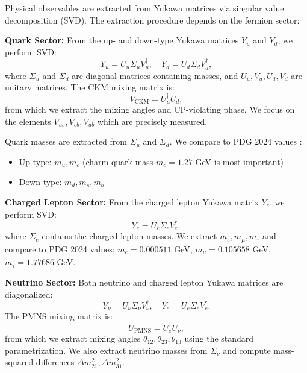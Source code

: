 \documentclass[12pt,a4paper]{article}
\begin{document}
Physical observables are extracted from Yukawa matrices via singular value decomposition (SVD). The extraction procedure depends on the fermion sector:

\textbf{Quark Sector:} From the up- and down-type Yukawa matrices $Y_u$ and $Y_d$, we perform SVD:
\begin{equation}
Y_u = U_u \Sigma_u V_u^\dagger, \quad Y_d = U_d \Sigma_d V_d^\dagger,
\end{equation}
where $\Sigma_u$ and $\Sigma_d$ are diagonal matrices containing masses, and $U_u, V_u, U_d, V_d$ are unitary matrices. The CKM mixing matrix is:
\begin{equation}
V_{\text{CKM}} = U_u^\dagger U_d,
\end{equation}
from which we extract the mixing angles and CP-violating phase. We focus on the elements $V_{us}, V_{cb}, V_{ub}$ which are precisely measured.

Quark masses are extracted from $\Sigma_u$ and $\Sigma_d$. We compare to PDG 2024 values \citep{PDG2024}:
\begin{itemize}
\item Up-type: $m_u, m_c$ (charm quark mass $m_c = 1.27$ GeV is most important)
\item Down-type: $m_d, m_s, m_b$
\end{itemize}

\textbf{Charged Lepton Sector:} From the charged lepton Yukawa matrix $Y_e$, we perform SVD:
\begin{equation}
Y_e = U_e \Sigma_e V_e^\dagger,
\end{equation}
where $\Sigma_e$ contains the charged lepton masses. We extract $m_e, m_\mu, m_\tau$ and compare to PDG 2024 values: $m_e = 0.000511$ GeV, $m_\mu = 0.105658$ GeV, $m_\tau = 1.77686$ GeV.

\textbf{Neutrino Sector:} Both neutrino and charged lepton Yukawa matrices are diagonalized:
\begin{equation}
Y_\nu = U_\nu \Sigma_\nu V_\nu^\dagger, \quad Y_e = U_e \Sigma_e V_e^\dagger.
\end{equation}
The PMNS mixing matrix is:
\begin{equation}
U_{\text{PMNS}} = U_e^\dagger U_\nu,
\end{equation}
from which we extract mixing angles $\theta_{12}, \theta_{23}, \theta_{13}$ using the standard parametrization. We also extract neutrino masses from $\Sigma_\nu$ and compute mass-squared differences $\Delta m_{21}^2, \Delta m_{31}^2$.
\end{document}
